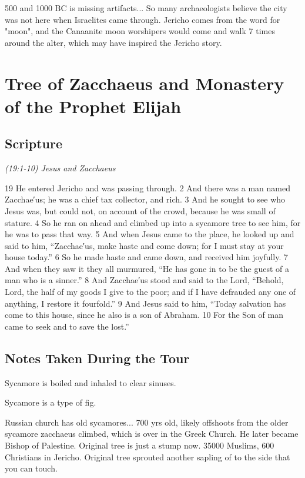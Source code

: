 \documentclass[letterpaper]{report}
\begin{document}
500 and 1000 BC is missing artifacts... So many archaeologists believe the city was not here when Israelites came through.
Jericho comes from the word for "moon", and the Canaanite moon worshipers would come and walk 7 times around the alter, which may have inspired the Jericho story.


\clearpage
\section{Tree of Zacchaeus and Monastery of the Prophet Elijah}
\begin{multicols}{2}
	\mbox{}
\end{multicols}
\subsection{Scripture}

{\centering
	\emph{(19:1-10) Jesus and Zacchaeus}\\
}
\begin{multicols}{2}
19 He entered Jericho and was passing through. 2 And there was a man named Zacchae′us; he was a chief tax collector, and rich. 3 And he sought to see who Jesus was, but could not, on account of the crowd, because he was small of stature. 4 So he ran on ahead and climbed up into a sycamore tree to see him, for he was to pass that way. 5 And when Jesus came to the place, he looked up and said to him, “Zacchae′us, make haste and come down; for I must stay at your house today.” 6 So he made haste and came down, and received him joyfully. 7 And when they saw it they all murmured, “He has gone in to be the guest of a man who is a sinner.” 8 And Zacchae′us stood and said to the Lord, “Behold, Lord, the half of my goods I give to the poor; and if I have defrauded any one of anything, I restore it fourfold.” 9 And Jesus said to him, “Today salvation has come to this house, since he also is a son of Abraham. 10 For the Son of man came to seek and to save the lost.”
\end{multicols}

\subsection{Notes Taken During the Tour}
\begin{multicols}{2}
Sycamore is boiled and inhaled  to clear sinuses.

Sycamore is a type of fig.

Russian church has old sycamores... 700 yrs old, likely offshoots from the older sycamore zacchaeus climbed, which is over in the Greek Church.
He later became Bishop of Palestine.
Original tree is just a stump now.
35000 Muslims, 600 Christians in Jericho.
Original tree sprouted another sapling of to the side that you can touch.
\end{multicols}
\end{document}
